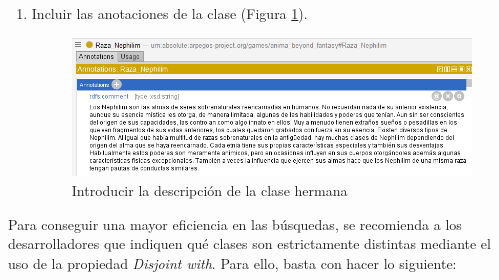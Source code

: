 \begin{enumerate}
    \item Incluir las anotaciones de la clase (Figura \ref*{CreateClass_8}).
    
    \begin{figure}[ht]
        \centering
        \includegraphics[scale=0.6]{Figures/Protege/CreateClass_8.png}
        \caption{Introducir la descripción de la clase hermana}
        \label{CreateClass_8}
    \end{figure}
\end{enumerate}

Para conseguir una mayor eficiencia en las búsquedas, se recomienda a los desarrolladores que indiquen qué clases son 
estrictamente distintas mediante el uso de la propiedad \textit{Disjoint with}. Para ello, basta con hacer lo siguiente:

